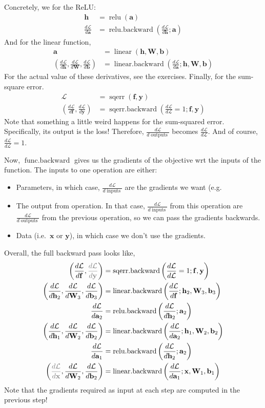 \documentclass{article}
\newcommand{\dt}[2][]{\frac{d #1}{d #2}}
\newcommand{\dL}{\dt[\L]}
\newcommand{\bracket}[3]{\left#1 #3 \right#2}
\renewcommand{\b}{\bracket{(}{)}}
\newcommand{\x}{\mathbf{x}}
\newcommand{\y}{\mathbf{y}}
\newcommand{\f}{\mathbf{f}}
\newcommand{\h}{\mathbf{h}}
\newcommand{\bv}{\mathbf{b}}
\renewcommand{\a}{\mathbf{a}}
\newcommand{\W}{\mathbf{W}}
\renewcommand{\L}{\mathcal{L}}
\newcommand{\linear}{\operatorname{linear}}
\newcommand{\relu}{\operatorname{relu}}
\newcommand{\sqerr}{\operatorname{sqerr}}
\newcommand{\funcback}{\operatorname{func{.}backward}}
\newcommand{\inputs}{\operatorname{inputs}}
\newcommand{\outputs}{\operatorname{outputs}}
\newcommand{\linearback}{\operatorname{linear{.}backward}}
\newcommand{\reluback}{\operatorname{relu{.}backward}}
\newcommand{\sqerrback}{\operatorname{sqerr{.}backward}}
\begin{document}
Concretely, we for the ReLU:
\begin{subequations}
\begin{align}
  \h &= \relu\b{\a} \\ 
  \dL{\a} &= \reluback\b{\dL{\h}; \a}
\end{align}
\end{subequations}
And for the linear function,
\begin{subequations}
\begin{align}
  \a &= \linear\b{\h, \W, \bv} \\ 
  \b{\dL{\h}, \dL{\W}, \dL{\bv}} &= \linearback\b{\dL{\a}; \h, \W, \bv}
\end{align}
\end{subequations}
For the actual value of these derivatives, see the exercises.
Finally, for the sum-square error.
\begin{subequations}
\begin{align}
  \L &= \sqerr\b{\f, \y} \\ 
  \b{\dL{\f}, \dL{\y}} &= \sqerrback\b{\dL{\L}=1; \f, \y}
\end{align}
\end{subequations}
Note that something a little weird happens for the sum-squared error.
Specifically, its output is the loss!
Therefore, $\dL{\outputs}$ becomes $\dL{\L}$.  And of course, $\dL{\L}=1$.

Now, $\funcback$ gives us the gradients of the objective wrt the inputs of the function. 
The inputs to one operation are either:
\begin{itemize}
  \item Parameters, in which case, $\dL{\inputs}$ are the gradients we want (e.g. 
  \item The output from operation. In that case, $\dL{\inputs}$ from this operation are $\dL{\outputs}$ from the previous operation, so we can pass the gradients backwards.
  \item Data (i.e.\ $\x$ or $\y$), in which case we don't use the gradients.
\end{itemize}
Overall, the full backward pass looks like,
\begin{subequations}
\label{eq:backward}
\begin{align}
  \b{\dL{\f}, \textcolor{gray}{\dL{\y}}} &= \sqerrback\b{\dL{\L}=1; \f, \y}\\
  \b{\dL{\h_2}, \dL{\W_3}, \dL{\bv_3}} &= \linearback\b{\dL{\f}; \h_2, \W_3, \bv_3}\\
  \dL{\a_2} &= \reluback\b{\dL{\h_2}; \a_2}\\
  \b{\dL{\h_1}, \dL{\W_2}, \dL{\bv_2}} &= \linearback\b{\dL{\a_2}; \h_1, \W_2, \bv_2}\\
  \dL{\a_1} &= \reluback\b{\dL{\h_2}; \a_2}\\
  \b{\textcolor{gray}{\dL{\x}}, \dL{\W_2}, \dL{\bv_2}} &= \linearback\b{\dL{\a_1}; \x, \W_1, \bv_1}
\end{align}
\end{subequations}
Note that the gradients required as input at each step are computed in the previous step!
\end{document}
